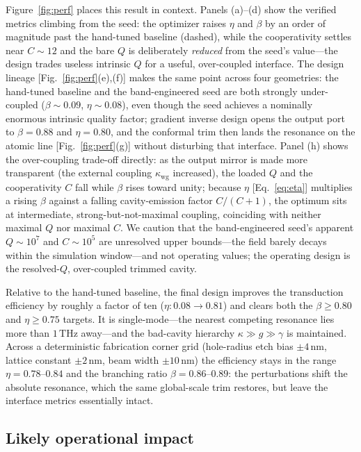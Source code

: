 \documentclass[%
 reprint,
 amsmath,amssymb,
 aps,prx,
 superscriptaddress,
]{revtex4-2}
\newcommand{\unit}[1]{\,\mathrm{#1}}
\begin{document}
Figure~\ref{fig:perf} places this result in context. Panels (a)--(d) show the
verified metrics climbing from the seed: the optimizer raises $\eta$ and $\beta$
by an order of magnitude past the hand-tuned baseline (dashed), while the
cooperativity settles near $C\sim12$ and the bare $Q$ is deliberately
\emph{reduced} from the seed's value---the design trades useless intrinsic $Q$ for
a useful, over-coupled interface. The design lineage [Fig.~\ref{fig:perf}(e),(f)]
makes the same point across four geometries: the hand-tuned baseline and the
band-engineered seed are both strongly under-coupled ($\beta\sim0.09$,
$\eta\sim0.08$), even though the seed achieves a nominally enormous intrinsic
quality factor; gradient inverse design opens the output port to $\beta=0.88$ and
$\eta=0.80$, and the conformal trim then lands the resonance on the atomic line
[Fig.~\ref{fig:perf}(g)] without disturbing that interface. Panel (h) shows the
over-coupling trade-off directly: as the output mirror is made more transparent
(the external coupling $\kappa_\mathrm{wg}$ increased), the loaded $Q$ and the
cooperativity $C$ fall while $\beta$ rises toward unity; because $\eta$
[Eq.~\eqref{eq:eta}] multiplies a rising $\beta$ against a falling
cavity-emission factor $C/(C{+}1)$, the optimum sits at intermediate,
strong-but-not-maximal coupling, coinciding with neither maximal $Q$ nor maximal
$C$. We caution
that the band-engineered seed's apparent $Q\sim10^7$ and $C\sim10^5$ are
unresolved upper bounds---the field barely decays within the simulation
window---and not operating values; the operating design is the resolved-$Q$,
over-coupled trimmed cavity.

Relative to the hand-tuned baseline, the final design improves the transduction
efficiency by roughly a factor of ten ($\eta:0.08\to0.81$) and clears both the
$\beta\ge0.80$ and $\eta\ge0.75$ targets. It is single-mode---the nearest
competing resonance lies more than $1\unit{THz}$ away---and the bad-cavity
hierarchy $\kappa\gg g\gg\gamma$ is maintained. Across a deterministic
fabrication corner grid (hole-radius etch bias $\pm 4\unit{nm}$, lattice constant
$\pm 2\unit{nm}$, beam width $\pm 10\unit{nm}$) the efficiency stays in the range
$\eta=0.78\text{--}0.84$ and the branching ratio $\beta=0.86\text{--}0.89$: the
perturbations shift the absolute resonance, which the same global-scale trim
restores, but leave the interface metrics essentially intact.

\subsection{Likely operational impact}
\end{document}

